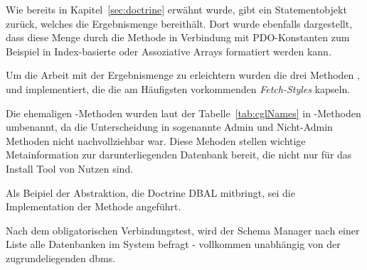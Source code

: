 Wie bereits in Kapitel~\ref{sec:doctrine} erwähnt wurde, gibt  ein Statementobjekt zurück, welches die Ergebnismenge bereithält. Dort wurde ebenfalls dargestellt, dass diese Menge durch die Methode  in Verbindung mit PDO-Konstanten zum Beispiel in Index-basierte oder Assoziative Arrays formatiert werden kann.

Um die Arbeit mit der Ergebnismenge zu erleichtern wurden die drei Methoden ,  und  implementiert, die die am Häufigsten vorkommenden  \textit{Fetch-Styles} kapseln.


Die ehemaligen -Methoden wurden laut der Tabelle~\ref{tab:cglNames} in -Methoden umbenannt, da die Unterscheidung in sogenannte Admin und Nicht-Admin Methoden nicht nachvollziehbar war. Diese Mehoden stellen wichtige Metainformation zur darunterliegenden Datenbank bereit, die nicht nur für das Install Tool von Nutzen sind.

Als Beipiel der Abstraktion, die Doctrine DBAL mitbringt, sei die Implementation der Methode  angeführt.

Nach dem obligatorischen Verbindungstest, wird der Schema Manager nach einer Liste alle Datenbanken im System befragt - vollkommen unabhängig von der zugrundeliegenden \gls{dbms}.


